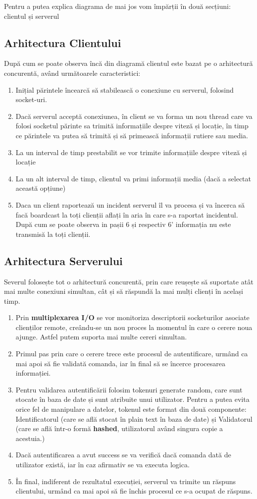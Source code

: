 \documentclass{article}
\begin{document}
Pentru a putea explica diagrama de mai jos vom împărții în două secțiuni: clientul și serverul
\subsection{Arhitectura Clientului}
După cum se poate observa încă din diagramă clientul este bazat pe o arhitectură concurentă, având următoarele caracteristici:
\begin{enumerate}
    \item Inițial părintele încearcă să stabilească o conexiune cu serverul, folosind socket-uri. 
    \item Dacă serverul acceptă conexiunea, în client se va forma un nou thread care va folosi socketul părinte sa trimită informațiile despre viteză și locație, în timp ce părintele va putea să trimită și să primească informații rutiere sau media.  
    \item La un interval de timp prestabilit se vor trimite informațiile despre viteză și locație
    \item La un alt interval de timp, clientul va primi informații media (dacă a selectat această opțiune)
    \item Daca un client raportează un incident serverul îl va procesa și va încerca să facă boardcast la toți clienții aflați în aria în care s-a raportat incidentul. După cum se poate observa in pașii 6 și respectiv 6' informația nu este transmisă la toți clienții.
\end{enumerate}
\subsection{Arhitectura Serverului}
Severul folosește tot o arhitectură concurentă, prin care reușește să suportate atât mai multe conexiuni simultan, cât și să răspundă la mai mulți clienți în același timp.
\begin{enumerate}
    \item Prin \textbf{multiplexarea I/O} se vor monitoriza descriptorii socketurilor asociate clienților remote, creându-se un nou proces la momentul în care o cerere noua ajunge. Astfel putem suporta mai multe cereri simultan.
    \item Primul pas prin care o cerere trece este procesul de autentificare, urmând ca mai apoi să fie validată comanda, iar în final să se încerce procesarea informației. 
    \item Pentru validarea autentificării folosim tokenuri generate random, care sunt stocate în baza de date și sunt atribuite unui utilizator. Pentru a putea evita orice fel de manipulare a datelor, tokenul este format din două componente: Identificatorul (care se află stocat în plain text în baza de date) și Validatorul (care se află într-o formă \textbf{hashed}, utilizatorul având singura copie a acestuia.)
    \item Dacă autentificarea a avut success se va verifică dacă comanda dată de utilizator există, iar în caz afirmativ se va executa logica. 
    \item În final, indiferent de rezultatul execuției, serverul va trimite un răspuns clientului, urmând ca mai apoi să fie închis procesul ce s-a ocupat de răspuns.
\end{enumerate}
\end{document}
